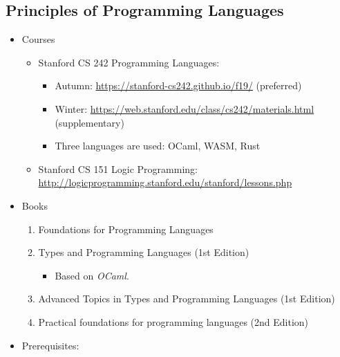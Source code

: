 \documentclass{article}
\begin{document}
\subsection{Principles of Programming Languages}
\begin{itemize}
    \item Courses
        \begin{itemize}
            \item Stanford CS 242 Programming Languages:
            \begin{itemize}
                \item Autumn:
                \href{https://stanford-cs242.github.io/f19/}{https://stanford-cs242.github.io/f19/}
                (preferred)
                \item Winter:
                \href{https://web.stanford.edu/class/cs242/materials.html}{https://web.stanford.edu/class/cs242/materials.html}
                (supplementary)
            \end{itemize}
            \begin{itemize}
                \item Three languages are used:
                OCaml, WASM, Rust
            \end{itemize}
            \item Stanford CS 151 Logic Programming:\\
            \href{http://logicprogramming.stanford.edu/stanford/lessons.php}{http://logicprogramming.stanford.edu/stanford/lessons.php}
        \end{itemize}
    \item Books
    \begin{enumerate}
        \item Foundations for Programming Languages
        \cite{mitchell1996foundations}
        \item Types and Programming Languages (1st Edition)
        \cite{pierce2002types}
        \begin{itemize}
            \item Based on \emph{OCaml}.
        \end{itemize}
        \item Advanced Topics in Types and Programming Languages (1st Edition) \cite{pierce2004advanced}
        \item Practical foundations for programming languages (2nd Edition)
        \cite{harper2016practical}
    \end{enumerate}
    \item Prerequisites:

\end{itemize}
\end{document}
